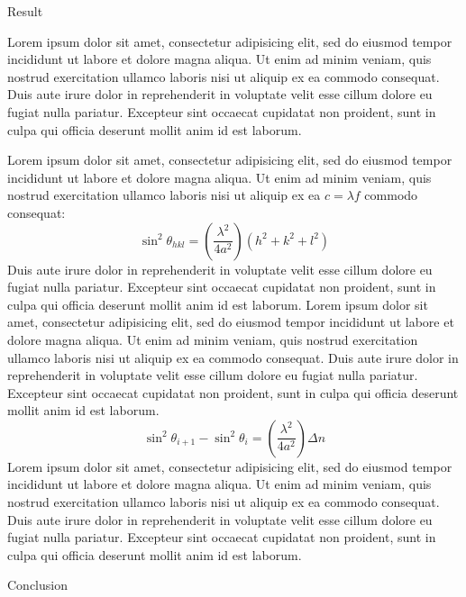 \documentclass[final,hyperref={pdfpagelabels=false}]{beamer}
\begin{document}
\begin{frame}{}
\begin{columns}[t]
\begin{column}{.97\textwidth}
\begin{multicols}{2}
\vspace{1.0\baselineskip}
{\Large Result}



	Lorem ipsum dolor sit amet, consectetur adipisicing
	elit, sed do eiusmod tempor incididunt ut labore et
	dolore magna aliqua. Ut enim ad minim veniam, quis
	nostrud exercitation ullamco laboris nisi ut aliquip
	ex ea commodo consequat. Duis aute irure dolor in
	reprehenderit in voluptate velit esse cillum dolore
	eu fugiat nulla pariatur. Excepteur sint occaecat
	cupidatat non proident, sunt in culpa qui officia
	deserunt mollit anim id est laborum.

    \vspace{1.0\baselineskip}	
	Lorem ipsum dolor sit amet, consectetur adipisicing
	elit, sed do eiusmod tempor incididunt ut labore et
	dolore magna aliqua. Ut enim ad minim veniam, quis
	nostrud exercitation ullamco laboris nisi ut aliquip
	ex ea $c = \lambda f$ commodo consequat:
	\[ \sin^{2}\theta_{hkl}=(\frac{\lambda^{2}}{4a^{2}})(h^{2}+k^{2}+l^{2}) \]
	Duis aute irure dolor in
	reprehenderit in voluptate velit esse cillum dolore
	eu fugiat nulla pariatur. Excepteur sint occaecat
	cupidatat non proident, sunt in culpa qui officia
	deserunt mollit anim id est laborum.
	Lorem ipsum dolor sit amet, consectetur adipisicing
	elit, sed do eiusmod tempor incididunt ut labore et
	dolore magna aliqua. Ut enim ad minim veniam, quis
	nostrud exercitation ullamco laboris nisi ut aliquip
	ex ea commodo consequat. Duis aute irure dolor in
	reprehenderit in voluptate velit esse cillum dolore
	eu fugiat nulla pariatur. Excepteur sint occaecat
	cupidatat non proident, sunt in culpa qui officia
	deserunt mollit anim id est laborum.
	\[ \sin^{2}\theta_{i+1}-\sin^{2}\theta_{i}=(\frac{\lambda^{2}}{4a^{2}})\Delta n \]
	Lorem ipsum dolor sit amet, consectetur adipisicing
	elit, sed do eiusmod tempor incididunt ut labore et
	dolore magna aliqua. Ut enim ad minim veniam, quis
	nostrud exercitation ullamco laboris nisi ut aliquip
	ex ea commodo consequat. Duis aute irure dolor in
	reprehenderit in voluptate velit esse cillum dolore
	eu fugiat nulla pariatur. Excepteur sint occaecat
	cupidatat non proident, sunt in culpa qui officia
	deserunt mollit anim id est laborum.

\vspace{1.0\baselineskip}
{\Large Conclusion}


\end{multicols}
\end{column}
\end{columns}
\end{frame}
\end{document}
